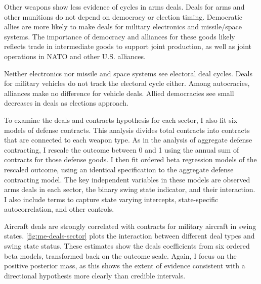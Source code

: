 \documentclass[12pt]{article}
\begin{document}
Other weapons show less evidence of cycles in arms deals. 
Deals for arms and other munitions do not depend on democracy or election timing. 
Democratic allies are more likely to make deals for military electronics and missile/space systems. 
The importance of democracy and alliances for these goods likely reflects trade in intermediate goods to support joint production, as well as joint operations in NATO and other U.S. alliances. 


Neither electronics nor missile and space systems see electoral deal cycles.
Deals for military vehicles do not track the electoral cycle either. 
Among autocracies, alliances make no difference for vehicle deals. 
Allied democracies see small decreases in deals as elections approach. 


To examine the deals and contracts hypothesis for each sector, I also fit six models of defense contracts. 
This analysis divides total contracts into contracts that are connected to each weapon type. 
As in the analysis of aggregate defense contracting, I rescale the outcome between 0 and 1 using the annual sum of contracts for those defense goods. 
I then fit ordered beta regression models of the rescaled outcome, using an identical specification to the aggregate defense contracting model.
The key independent variables in these models are observed arms deals in each sector, the binary swing state indicator, and their interaction. 
I also include terms to capture state varying intercepts, state-specific autocorrelation, and other controls. 


Aircraft deals are strongly correlated with contracts for military aircraft in swing states. 
\autoref{fig:me-deals-sector} plots the interaction between different deal types and swing state status.  
These estimates show the deals coefficients from six ordered beta models, transformed back on the outcome scale. 
Again, I focus on the positive posterior mass, as this shows the extent of evidence consistent with a directional hypothesis more clearly than credible intervals.
\end{document}
